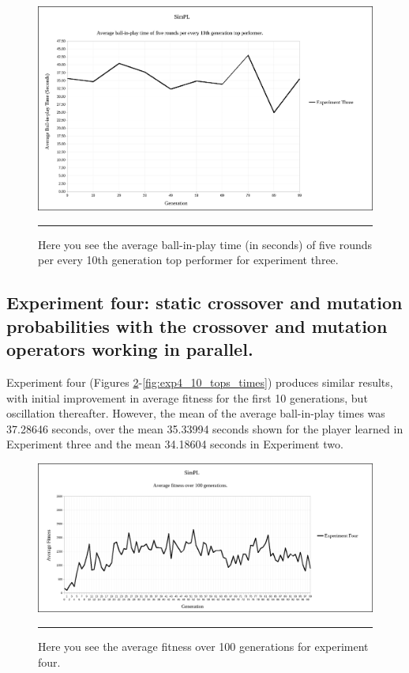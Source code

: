 \begin{figure}[htbp]  
  \centering
  \includegraphics[width=5in]{../Figures/Chapter3/exp3_10_tops_times.png}
  \rule{35em}{0.5pt}
  \caption[Experiment Three Top Performers Tournament]{Here you see the average ball-in-play time (in seconds) of five rounds per every 10th generation top performer for experiment three.}
  \label{fig:exp3_10_tops_times}
\end{figure}

\subsection[Experiment Four]{Experiment four: static crossover and mutation probabilities with the crossover and mutation operators working in parallel.}

Experiment four (Figures \ref{fig:exp4_avg_fit}-\ref{fig:exp4_10_tops_times}) produces similar results, with initial improvement in average fitness for the first 10 generations, but oscillation thereafter. However, the mean of the average ball-in-play times was 37.28646 seconds, over the mean 35.33994 seconds shown for the player learned in Experiment three and the mean 34.18604 seconds in Experiment two.

\begin{figure}[htbp]  
  \centering
  \includegraphics[width=5in]{../Figures/Chapter3/exp4_avg_fit.png}
  \rule{35em}{0.5pt}
  \caption[Experiment Four Average Fitness]{Here you see the average fitness over 100 generations for experiment four.}
  \label{fig:exp4_avg_fit}
\end{figure}

